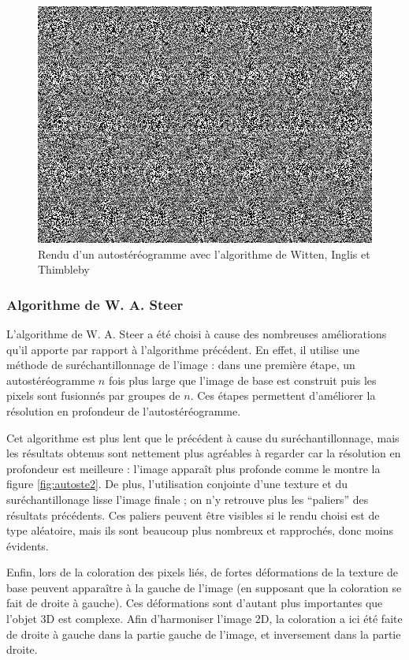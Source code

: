 \begin{figure}[h]
	\centering
	\includegraphics[scale=0.6]{autoste1.png}
	\caption{\label{fig:autoste1} Rendu d'un autostéréogramme avec l'algorithme de Witten, Inglis et Thimbleby \protect}
\end{figure}

  \subsubsection{Algorithme de W. A. Steer}
  
  L'algorithme de W. A. Steer a été choisi à cause des nombreuses améliorations qu'il apporte par rapport à l'algorithme précédent. En effet, il utilise une méthode de suréchantillonnage de l'image : dans une première étape, un autostéréogramme $n$ fois plus large que l'image de base est construit puis les pixels sont fusionnés par groupes de $n$. Ces étapes permettent d'améliorer la résolution en profondeur de l'autostéréogramme.
  
  Cet algorithme est plus lent que le précédent à cause du suréchantillonnage, mais les résultats obtenus sont nettement plus agréables à regarder car la résolution en profondeur est meilleure : l'image apparaît plus profonde comme le montre la figure \ref{fig:autoste2}. De plus, l'utilisation conjointe d'une texture et du suréchantillonage lisse l'image finale ; on n'y retrouve plus les ``paliers'' des résultats précédents. Ces paliers peuvent être visibles si le rendu choisi est de type aléatoire, mais ils sont beaucoup plus nombreux et rapprochés, donc moins évidents.

  Enfin, lors de la coloration des pixels liés, de fortes déformations de la texture de base peuvent apparaître à la gauche de l'image (en supposant que la coloration se fait de droite à gauche). Ces déformations sont d'autant plus importantes que l'objet 3D est complexe. Afin d'harmoniser l'image 2D, la coloration a ici été faite de droite à gauche dans la partie gauche de l'image, et inversement dans la partie droite.

